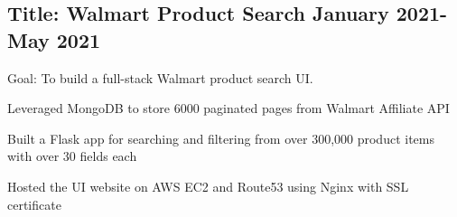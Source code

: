 \documentclass[11pt]{article}
\begin{document}
\subsection*{Title: Walmart Product Search \hfill {\normalfont January 2021-May 2021}}
\noindent
\href{https://github.com/Anthonyive/DSCI-551-Project.git}{} Goal: To build a full-stack Walmart product search UI.
\begin{compactitem}
    \item Leveraged MongoDB to store 6000 paginated pages from Walmart 
        Affiliate API
    \item Built a Flask app for searching and filtering from over 300,000 
        product items with over 30 fields each
    \item Hosted the UI website on AWS EC2 and Route53 using Nginx with SSL 
        certificate
\end{compactitem}
\vspace{0.1in}


\end{document}
